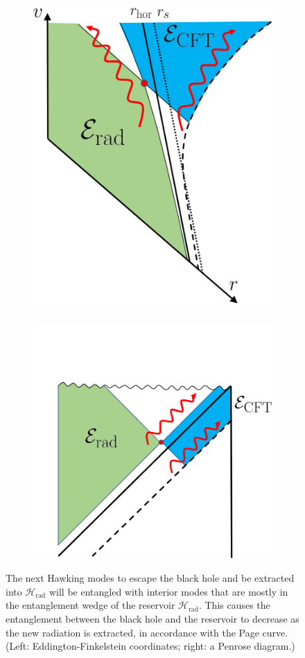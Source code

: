 \documentclass[12pt]{article}
\begin{document}
\begin{figure} [t]
\centering
\vspace{0.5cm}
\begin{subfigure}{.48\textwidth}
  \centering
 \includegraphics[width = 0.58\linewidth]{HawkingModes_Eddington.png}
\end{subfigure}
\begin{subfigure}{.48\textwidth}
\vspace{-2cm}
 \includegraphics[width = 0.8\linewidth]{HawkingModes_Penrose.png}
 \centering

\end{subfigure}
\caption{The next Hawking modes to escape the black hole and be extracted into $\mathcal{H}_\text{rad}$ will be entangled with interior modes that are mostly in the entanglement wedge of the reservoir $\mathcal{H}_\text{rad}$. This causes the entanglement between the black hole and the reservoir to decrease as the new radiation is extracted, in accordance with the Page curve. (Left: Eddington-Finkelstein coordinates; right: a Penrose diagram.)}
\label{fig:hawkingmodes}
\end{figure}
\end{document}

